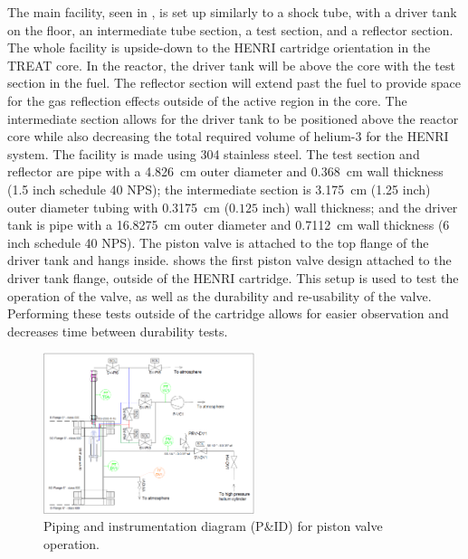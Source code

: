 The main facility, seen in , is set up similarly to a shock tube, with a driver tank on the floor, an intermediate tube section, a test section, and a reflector section.
The whole facility is upside-down to the HENRI cartridge orientation in the TREAT core.
In the reactor, the driver tank will be above the core with the test section in the fuel.
The reflector section will extend past the fuel to provide space for the gas reflection effects outside of the active region in the core.
The intermediate section allows for the driver tank to be positioned above the reactor core while also decreasing the total required volume of helium-3 for the HENRI system.
The facility is made using 304 stainless steel.
The test section and reflector are pipe with a \SI{4.826}{\centi\meter} outer diameter and \SI{0.368}{\centi\meter} wall thickness (1.5 inch schedule 40 NPS); the intermediate section is \SI{3.175}{\centi\meter} (1.25 inch) outer diameter tubing with \SI{0.3175}{\centi\meter} ($0.125$ inch) wall thickness; and the driver tank is pipe with a \SI{16.8275}{\centi\meter} outer diameter and \SI{0.7112}{\centi\meter} wall thickness (6 inch schedule 40 NPS).
The piston valve is attached to the top flange of the driver tank and hangs inside.  shows the first piston valve design attached to the driver tank flange, outside of the HENRI cartridge.
This setup is used to test the operation of the valve, as well as the durability and re-usability of the valve.
Performing these tests outside of the cartridge allows for easier observation and decreases time between durability tests.


%
\begin{figure}[tb]
    \vspace{16pt}
    \centering
    \includegraphics[width=0.55\textwidth]{experiment/photos/HENRI_valve_PID.PNG}
    \caption{Piping and instrumentation diagram (P\&ID) for piston valve operation.}
    \label{fig:sv pid}
    \vspace{16pt}
\end{figure}
%


